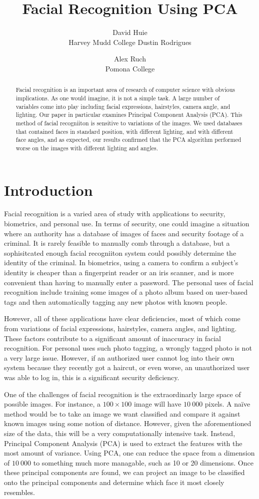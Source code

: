 \documentclass[letterpaper]{article}
\title{Facial Recognition Using PCA}
\author{David Huie \\ Harvey Mudd College \And Dustin Rodrigues \and
Alex Ruch \\ Pomona College}
\begin{document}
\nocopyright
\maketitle
\begin{abstract}
Facial recognition is an important area of research of computer science with obvious implications. As one would imagine, it is not a simple task.  A large number of variables come into play including facial expressions, hairstyles, camera angle, and lighting. Our paper in particular examines Principal Component Analysis (PCA).  This method of facial recogniiton is sensitive to variations of the images. We used databases that contained faces in standard position, with different lighting, and with different face angles, and as expected, our results confirmed that the PCA algorithm performed worse on the images with different lighting and angles.
\end{abstract}
\section{Introduction}
Facial recognition is a varied area of study with applications to security, biometrics, and personal use.  In terms of security, one could imagine a situation where an authority has a database of images of faces and security footage of a criminal.  It is rarely feasible to manually comb through a database, but a sophisitcated enough facial recogniiton system could possibly determine the identity of the criminal.  In biometrics, using a camera to confirm a subject's identity is cheaper than a fingerprint reader or an iris scanner, and is more convenient than having to manually enter a password.  The personal uses of facial recognition include training some images of a photo album based on user-based tags and then automatically tagging any new photos with known people.

However, all of these applications have clear deficiencies, most of which come from variations of facial expressions, hairstyles, camera angles, and lighting.  These factors contribute to a significant amount of inaccuracy in facial recognition. For personal uses such photo tagging, a wrongly tagged photo is not a very large issue.  However, if an authorized user cannot log into their own system because they recently got a haircut, or even worse, an unauthorized user was able to log in, this is a significant security deficiency. 

One of the challenges of facial recognition is the extraordinarly large space of possible images.  For instance, a $100\times100$ image will have $10\ 000$ pixels. A na\"ive method would be to take an image we want classified and compare it against known images using some notion of distance.  However, given the aforementioned size of the data, this will be a very computationally intensive task.  Instead, Principal Component Analysis (PCA) is used to extract the features with the most amount of variance. Using PCA, one can reduce the space from a dimension of $10\ 000$ to something much more managable, such as 10 or 20 dimensions.  Once these principal components are found, we can project an image to be classified onto the principal components and determine which face it most closely resembles.
\end{document}
